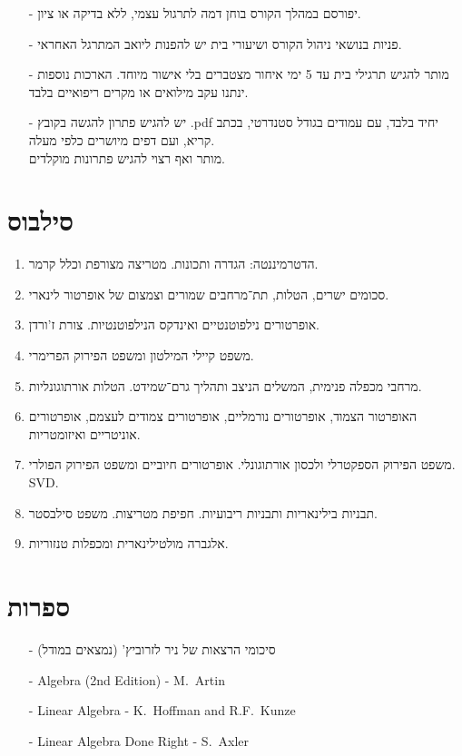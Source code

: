 \documentclass{article}
\begin{document}
\begin{itemize}
\item[-]
יפורסם במהלך הקורס בוחן דמה לתרגול עצמי, ללא בדיקה או ציון.
\item[-]
פניות בנושאי ניהול הקורס ושיעורי בית יש להפנות ליואב המתרגל האחראי.
\item[-]
מותר להגיש תרגילי בית עד 5 ימי איחור מצטברים בלי אישור מיוחד. הארכות נוספות ינתנו עקב מילואים או מקרים ריפואיים בלבד.
\item[-]
יש להגיש פתרון להגשה בקובץ \textenglish{.pdf} יחיד בלבד, עם עמודים בגודל סטנדרטי, בכתב קריא, ועם דפים מיושרים כלפי מעלה.
\\
מותר ואף רצוי להגיש פתרונות מוקלדים.
\end{itemize}

\pagebreak

\section*{סילבוס}
\begin{enumerate}
\item הדטרמיננטה: הגדרה ותכונות. מטריצה מצורפת וכלל קרמר.
\item סכומים ישרים, הטלות, תת־מרחבים שמורים וצמצום של אופרטור לינארי.
\item אופרטורים נילפוטנטיים ואינדקס הנילפוטנטיות. צורת ז'ורדן.
\item משפט קיילי המילטון ומשפט הפירוק הפרימרי.
\item מרחבי מכפלה פנימית, המשלים הניצב ותהליך גרם־שמידט. הטלות אורתוגונליות.
\item האופרטור הצמוד, אופרטורים נורמליים, אופרטורים צמודים לעצמם, אופרטורים אוניטריים ואיזומטריות.
\item משפט הפירוק הספקטרלי ולכסון אורתוגונלי. אופרטורים חיוביים ומשפט הפירוק הפולרי. \textenglish{SVD}.
\item תבניות בילינאריות ותבניות ריבועיות. חפיפת מטריצות. משפט סילבסטר.
\item אלגברה מולטילינארית ומכפלות טנזוריות.
\end{enumerate}

\section*{ספרות}
\begin{itemize}
\item[-] סיכומי הרצאות של ניר לזרוביץ' (נמצאים במודל)
\item[-] \textenglish{Algebra (2nd Edition) - M.~Artin}
\item[-] \textenglish{Linear Algebra - K.~Hoffman and R.F.~Kunze}
\item[-] \textenglish{Linear Algebra Done Right - S.~Axler}
\end{itemize}
\end{document}

